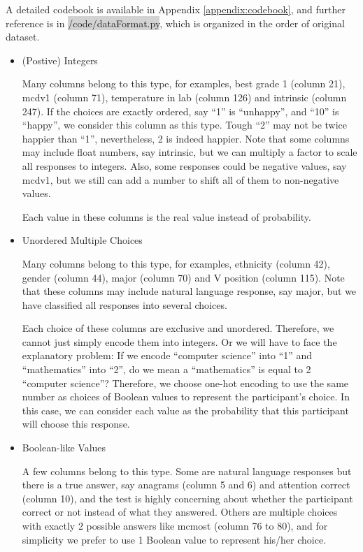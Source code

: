 \documentclass[11pt, a4paper]{article}
\begin{document}
\begin{enumerate}
\begin{itemize}
{			A detailed codebook is available in Appendix \ref{appendix:codebook}, and further reference is in \colorbox{lightgray}{/code/dataFormat.py}, which is organized in the order of original dataset.}
		\begin{itemize}
			\item {(Postive) Integers}
			\par{Many columns belong to this type, for examples, best grade 1 (column 21), mcdv1 (column 71), temperature in lab (column 126) and intrinsic (column 247). If the choices are exactly ordered, say “1” is “unhappy”, and “10” is “happy”, we consider this column as this type. Tough “2” may not be twice happier than “1”, nevertheless, 2 is indeed happier. Note that some columns may include float numbers, say intrinsic, but we can multiply a factor to scale all responses to integers. Also, some responses could be negative values, say mcdv1, but we still can add a number to shift all of them to non-negative values.}
			\par{Each value in these columns is the real value instead of probability.}
			\item {Unordered Multiple Choices}
			\par{Many columns belong to this type, for examples, ethnicity (column 42), gender (column 44), major (column 70) and V position (column 115). Note that these columns may include natural language response, say major, but we have classified all responses into several choices.}
			\par{Each choice of these columns are exclusive and unordered. Therefore, we cannot just simply encode them into integers. Or we will have to face the explanatory problem: If we encode “computer science” into “1” and “mathematics” into “2”, do we mean a “mathematics” is equal to 2 “computer science”? Therefore, we choose one-hot encoding to use the same number as choices of Boolean values to represent the participant’s choice. In this case, we can consider each value as the probability that this participant will choose this response. }
			\item {Boolean-like Values}
			\par{A few columns belong to this type. Some are natural language responses but there is a true answer, say anagrams (column 5 and 6) and attention correct (column 10), and the test is highly concerning about whether the participant correct or not instead of what they answered. Others are multiple choices with exactly 2 possible answers like mcmost (column 76 to 80), and for simplicity we prefer to use 1 Boolean value to represent his/her choice.}

\end{itemize}
\end{itemize}
\end{enumerate}
\end{document}
